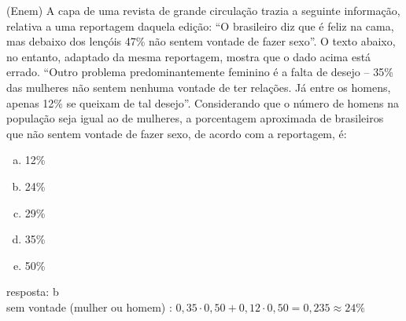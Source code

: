 \begin{ex}
(Enem) A capa de uma revista de grande circulação trazia a seguinte informação, relativa a uma reportagem daquela edição:
“O brasileiro diz que é feliz na cama, mas debaixo dos lençóis 47\% não sentem vontade de fazer sexo”.
O texto abaixo, no entanto, adaptado da mesma reportagem, mostra que o dado acima está errado.
“Outro problema predominantemente feminino é a falta de desejo – 35\% das mulheres não sentem nenhuma vontade de ter relações. Já entre os homens, apenas 12\% se queixam de tal desejo”.
Considerando que o número de homens na população seja igual ao de mulheres, a porcentagem aproximada de brasileiros que não sentem vontade de fazer sexo, de acordo com a reportagem, é:
   \begin{enumerate}[(a)]
   \item 12\%
   \item 24\%
   \item 29\%
   \item 35\%
   \item 50\%
   \end{enumerate}
     \begin{sol}
      resposta: b \\
      sem vontade (mulher ou homem) : $0,35\cdot0,50+0,12\cdot0,50=0,235 \approx 24\%$ 
     \end{sol}
\end{ex}